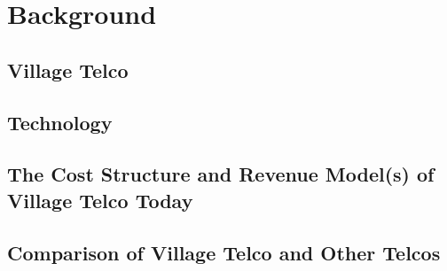 \chapter{Background}
\label{chp:background} 

\section{Village Telco}

\section{Technology}

\section{The Cost Structure and Revenue Model(s) of Village Telco Today}

\section{Comparison of Village Telco and Other Telcos}